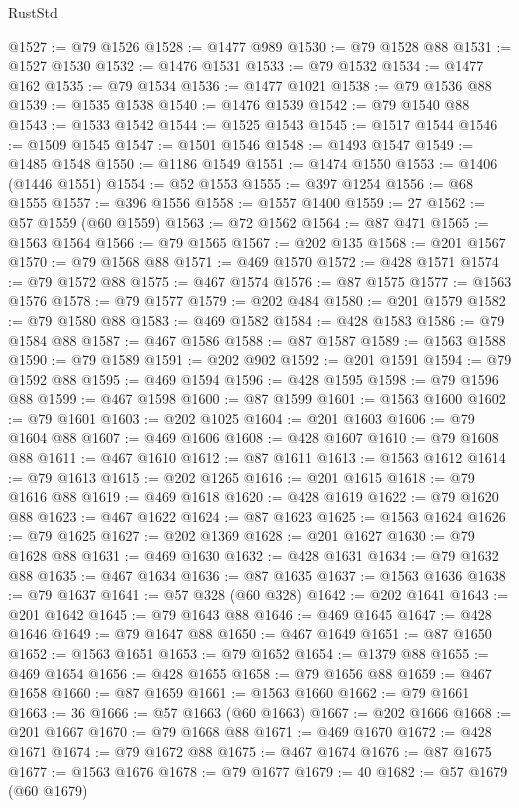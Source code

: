 \begin{lexlean}{RustStd}
\begin{coremodule}
@1527 := @79 @1526
@1528 := @1477 @989
@1530 := @79 @1528 @88
@1531 := @1527 @1530
@1532 := @1476 @1531
@1533 := @79 @1532
@1534 := @1477 @162
@1535 := @79 @1534
@1536 := @1477 @1021
@1538 := @79 @1536 @88
@1539 := @1535 @1538
@1540 := @1476 @1539
@1542 := @79 @1540 @88
@1543 := @1533 @1542
@1544 := @1525 @1543
@1545 := @1517 @1544
@1546 := @1509 @1545
@1547 := @1501 @1546
@1548 := @1493 @1547
@1549 := @1485 @1548
@1550 := @1186 @1549
@1551 := @1474 @1550
@1553 := @1406 (@1446 @1551)
@1554 := @52 @1553
@1555 := @397 @1254
@1556 := @68 @1555
@1557 := @396 @1556
@1558 := @1557 @1400
@1559 := 27
@1562 := @57 @1559 (@60 @1559)
@1563 := @72 @1562
@1564 := @87 @471
@1565 := @1563 @1564
@1566 := @79 @1565
@1567 := @202 @135
@1568 := @201 @1567
@1570 := @79 @1568 @88
@1571 := @469 @1570
@1572 := @428 @1571
@1574 := @79 @1572 @88
@1575 := @467 @1574
@1576 := @87 @1575
@1577 := @1563 @1576
@1578 := @79 @1577
@1579 := @202 @484
@1580 := @201 @1579
@1582 := @79 @1580 @88
@1583 := @469 @1582
@1584 := @428 @1583
@1586 := @79 @1584 @88
@1587 := @467 @1586
@1588 := @87 @1587
@1589 := @1563 @1588
@1590 := @79 @1589
@1591 := @202 @902
@1592 := @201 @1591
@1594 := @79 @1592 @88
@1595 := @469 @1594
@1596 := @428 @1595
@1598 := @79 @1596 @88
@1599 := @467 @1598
@1600 := @87 @1599
@1601 := @1563 @1600
@1602 := @79 @1601
@1603 := @202 @1025
@1604 := @201 @1603
@1606 := @79 @1604 @88
@1607 := @469 @1606
@1608 := @428 @1607
@1610 := @79 @1608 @88
@1611 := @467 @1610
@1612 := @87 @1611
@1613 := @1563 @1612
@1614 := @79 @1613
@1615 := @202 @1265
@1616 := @201 @1615
@1618 := @79 @1616 @88
@1619 := @469 @1618
@1620 := @428 @1619
@1622 := @79 @1620 @88
@1623 := @467 @1622
@1624 := @87 @1623
@1625 := @1563 @1624
@1626 := @79 @1625
@1627 := @202 @1369
@1628 := @201 @1627
@1630 := @79 @1628 @88
@1631 := @469 @1630
@1632 := @428 @1631
@1634 := @79 @1632 @88
@1635 := @467 @1634
@1636 := @87 @1635
@1637 := @1563 @1636
@1638 := @79 @1637
@1641 := @57 @328 (@60 @328)
@1642 := @202 @1641
@1643 := @201 @1642
@1645 := @79 @1643 @88
@1646 := @469 @1645
@1647 := @428 @1646
@1649 := @79 @1647 @88
@1650 := @467 @1649
@1651 := @87 @1650
@1652 := @1563 @1651
@1653 := @79 @1652
@1654 := @1379 @88
@1655 := @469 @1654
@1656 := @428 @1655
@1658 := @79 @1656 @88
@1659 := @467 @1658
@1660 := @87 @1659
@1661 := @1563 @1660
@1662 := @79 @1661
@1663 := 36
@1666 := @57 @1663 (@60 @1663)
@1667 := @202 @1666
@1668 := @201 @1667
@1670 := @79 @1668 @88
@1671 := @469 @1670
@1672 := @428 @1671
@1674 := @79 @1672 @88
@1675 := @467 @1674
@1676 := @87 @1675
@1677 := @1563 @1676
@1678 := @79 @1677
@1679 := 40
@1682 := @57 @1679 (@60 @1679)

\end{coremodule}
\end{lexlean}

